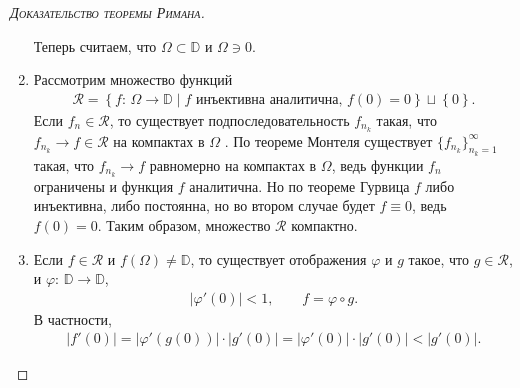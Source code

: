 \documentclass[../complex-analysis.tex]{subfiles}
\begin{document}
\begin{proof}[\normalfont\textsc{Доказательство теоремы Римана}]
\begin{enumerate}
   Теперь считаем, что $ \Omega \subset \mathbb D $ и $ \Omega \ni 0 $.

  \item Рассмотрим множество функций
   \begin{align*}
    \mathcal R = \left\{ f \colon\,\Omega \to \mathbb D \mid f \text{ инъективна аналитична, } f(0) = 0  \right\} \sqcup \left\{ 0 \right\}.
   \end{align*} Если $ f_n \in \mathcal R$, то существует подпоследовательность $ f_{n_k} $ такая, что  $ f_{n_k} \to f \in \mathcal R $  на компактах в $ \Omega $ . По теореме Монтеля существует $ \{f_{n_k}\}_{n_k=1}^{\infty}   $ такая, что $ f_{n_k} \to f $ равномерно на компактах в $ \Omega $, ведь функции $ f_n $ ограничены и функция $ f $ аналитична. Но по теореме Гурвица $ f $ либо инъективна, либо постоянна, но во втором случае будет $ f \equiv 0 $, ведь $ f(0) = 0 $. Таким образом, множество $ \mathcal R $ компактно.

  \item Если $ f \in \mathcal R $ и $ f(\Omega) \neq \mathbb D $, то существует отображения $ \varphi $ и $ g $ такое, что $ g \in \mathcal R $, и $ \varphi\colon\,\mathbb D \to \mathbb D $,
   \begin{align*}
    \left| \varphi'(0) \right| < 1, \qquad f = \varphi \circ g.
   \end{align*} В частности,
   \begin{align*}
    \left| f'(0) \right| = \left| \varphi'(g(0)) \right| \cdot \left| g'(0) \right| = \left| \varphi'(0) \right| \cdot \left| g'(0) \right| < \left| g'(0) \right|.
   \end{align*}


\end{enumerate}
\end{proof}
\end{document}
